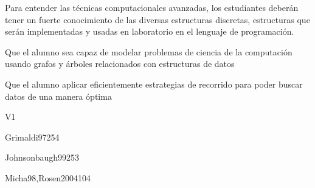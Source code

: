 \begin{syllabus}


\begin{justification}
   Para entender las técnicas computacionales avanzadas, los estudiantes deberán tener un fuerte conocimiento de las
   diversas estructuras discretas, estructuras que serán implementadas y usadas en laboratorio en el lenguaje de programación.
   \end{justification}
   
   \begin{goals}
   \item Que el alumno sea capaz de modelar problemas de ciencia de la computación usando grafos y árboles relacionados con estructuras de datos
   \item Que el alumno aplicar eficientemente estrategias de recorrido para poder buscar datos de una manera óptima
   \end{goals}
   
   \begin{outcomes}{V1}
      \item {}
      \item {}
      \item {}
      \item {}
    \end{outcomes}
   
   \begin{unit}{\DSBasicsofCounting}{}{Grimaldi97}{25}{4}
      \DSBasicsofCountingAllTopics
      \DSBasicsofCountingAllLearningOutcomes
   \end{unit}
   
   \begin{unit}{\DSGraphsandTrees}{}{Johnsonbaugh99}{25}{3}
      \DSGraphsandTreesAllTopics
      \DSGraphsandTreesAllLearningOutcomes
   \end{unit}
   
   \begin{unit}{\DSDiscreteProbability}{}{Micha98,Rosen2004}{10}{4}
      \DSDiscreteProbabilityAllTopics
      \DSDiscreteProbabilityAllLearningOutcomes
   \end{unit}
   
   \begin{coursebibliography}
   \end{coursebibliography}
   
   \end{syllabus}
   
   
